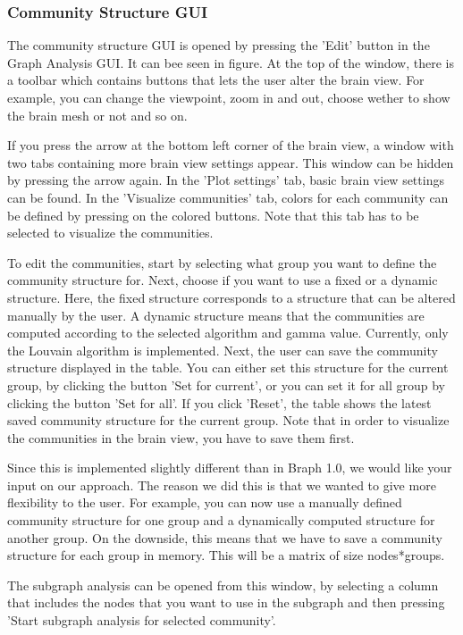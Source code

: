 \documentclass{article}
\begin{document}
\subsubsection{Community Structure GUI}

The community structure GUI is opened by pressing the 'Edit' button in the Graph Analysis GUI. It can bee seen in figure. At the top of the window, there is a toolbar which contains buttons that lets the user alter the brain view. For example, you can change the viewpoint, zoom in and out, choose wether to show the brain mesh or not and so on.

If you press the arrow at the bottom left corner of the brain view, a window with two tabs containing more brain view settings appear. This window can be hidden by pressing the arrow again. In the 'Plot settings' tab, basic brain view settings can be found. In the 'Visualize communities' tab, colors for each community can be defined by pressing on the colored buttons. Note that this tab has to be selected to visualize the communities. 

To edit the communities, start by selecting what group you want to define the community structure for. Next, choose if you want to use a fixed or a dynamic structure. Here, the fixed structure corresponds to a structure that can be altered manually by the user. A dynamic structure means that the communities are computed according to the selected algorithm and gamma value. Currently, only the Louvain algorithm is implemented. Next, the user can save the community structure displayed in the table. You can either set this structure for the current group, by clicking the button 'Set for current', or you can set it for all group by clicking the button 'Set for all'. If you click 'Reset', the table shows the latest saved community structure for the current group. Note that in order to visualize the communities in the brain view, you have to save them first.

Since this is implemented slightly different than in Braph 1.0, we would like your input on our approach. The reason we did this is that we wanted to give more flexibility to the user. For example, you can now use a manually defined community structure for one group and a dynamically computed structure for another group. On the downside, this means that we have to save a community structure for each group in memory. This will be a matrix of size nodes*groups.

The subgraph analysis can be opened from this window, by selecting a column that includes the nodes that you want to use in the subgraph and then pressing 'Start subgraph analysis for selected community'.
\end{document}
